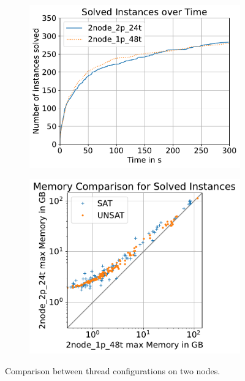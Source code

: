 \documentclass[12pt,a4paper,twoside]{scrartcl}
\numberwithin{equation}{section}
\begin{document}
\begin{figure}[!h]
  \center
  \begin{subfigure}[c]{0.45\textwidth}
    \center
    \includegraphics[scale=0.45]{plots/config_compare/2node_config_compare.pdf}
    \caption{}
    \label{2nodeConfigRuntimeCompare}
  \end{subfigure}
  \hfill
  \begin{subfigure}[c]{0.45\textwidth}
    \center
    \includegraphics[scale=0.45]{plots/config_compare/2node_config_mem_compare.pdf}
    \caption{}
    \label{fig:2nodeConfigMemCompare}
  \end{subfigure}
  \caption{Comparison between thread configurations on two nodes.}
  \label{fig:2nodeConfigCompare}
\end{figure}
\end{document}
